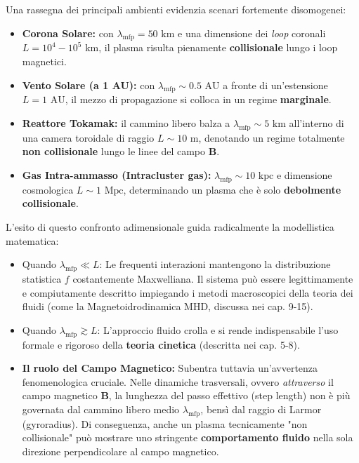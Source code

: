 Una rassegna dei principali ambienti evidenzia scenari fortemente disomogenei:
\begin{itemize}
\item \textbf{Corona Solare:} con $\lambda_{\text{mfp}} = 50 \text{ km}$ e una dimensione dei \textit{loop} coronali $L = 10^4 - 10^5 \text{ km}$, il plasma risulta pienamente \textbf{collisionale} lungo i loop magnetici.
\item \textbf{Vento Solare (a 1 AU):} con $\lambda_{\text{mfp}} \sim 0.5 \text{ AU}$ a fronte di un'estensione $L = 1 \text{ AU}$, il mezzo di propagazione si colloca in un regime \textbf{marginale}.
\item \textbf{Reattore Tokamak:} il cammino libero balza a $\lambda_{\text{mfp}} \sim 5 \text{ km}$ all'interno di una camera toroidale di raggio $L \sim 10 \text{ m}$, denotando un regime totalmente \textbf{non collisionale} lungo le linee del campo $\mathbf{B}$.
\item \textbf{Gas Intra-ammasso (Intracluster gas):} $\lambda_{\text{mfp}} \sim 10 \text{ kpc}$ e dimensione cosmologica $L \sim 1 \text{ Mpc}$, determinando un plasma che è solo \textbf{debolmente collisionale}.
\end{itemize}

L'esito di questo confronto adimensionale guida radicalmente la modellistica matematica:
\begin{itemize}
\item Quando \textbf{$\lambda_{\text{mfp}} \ll L$}: Le frequenti interazioni mantengono la distribuzione statistica $f$ costantemente Maxwelliana. Il sistema può essere legittimamente e compiutamente descritto impiegando i metodi macroscopici della teoria dei fluidi (come la Magnetoidrodinamica MHD, discussa nei cap. 9-15).
\item Quando \textbf{$\lambda_{\text{mfp}} \gtrsim L$}: L'approccio fluido crolla e si rende indispensabile l'uso formale e rigoroso della \textbf{teoria cinetica} (descritta nei cap. 5-8).
\item \textbf{Il ruolo del Campo Magnetico:} Subentra tuttavia un'avvertenza fenomenologica cruciale. Nelle dinamiche trasversali, ovvero \textit{attraverso} il campo magnetico $\mathbf{B}$, la lunghezza del passo effettivo (step length) non è più governata dal cammino libero medio $\lambda_{\text{mfp}}$, bensì dal raggio di Larmor (gyroradius). Di conseguenza, anche un plasma tecnicamente "non collisionale" può mostrare uno stringente \textbf{comportamento fluido} nella sola direzione perpendicolare al campo magnetico.
\end{itemize}

